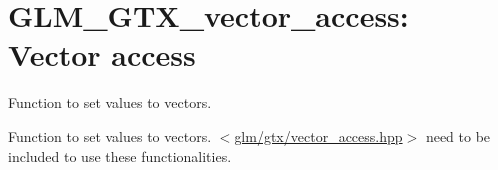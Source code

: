 \hypertarget{group__gtx__vector__access}{\section{\-G\-L\-M\-\_\-\-G\-T\-X\-\_\-vector\-\_\-access\-: \-Vector access}
\label{group__gtx__vector__access}
}


\-Function to set values to vectors.  


\-Function to set values to vectors. $<$\hyperlink{vector__access_8hpp}{glm/gtx/vector\-\_\-access.\-hpp}$>$ need to be included to use these functionalities. 